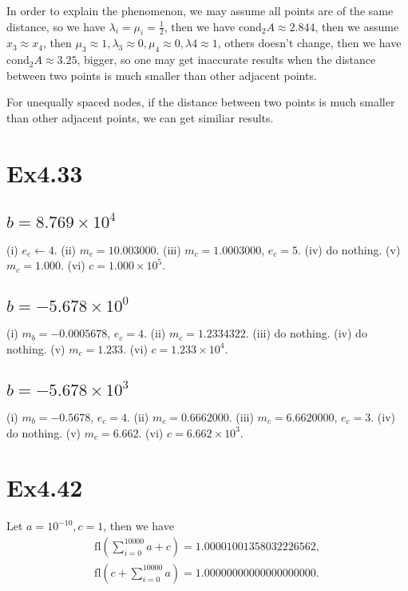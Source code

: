 \documentclass[a4paper]{article}
\begin{document}
In order to explain the phenomenon, we may assume all points are of the same distance, so we have $\lambda_i = \mu_i = \frac{1}{2}$, then we have $\mathrm{cond}_2 A \approx 2.844$, then we assume $x_3 \approx x_4$, then $\mu_3 \approx 1, \lambda_3 \approx 0, \mu_4 \approx 0, \lambda 4 \approx 1$, others doesn't change, then we have $\mathrm{cond}_2 A \approx 3.25$, bigger, so one may get inaccurate results when the distance between two points is much smaller than other adjacent points.

For unequally spaced nodes, if the distance between two points is much smaller than other adjacent points, we can get similiar results. 


\section*{Ex4.33}

\subsection*{$b=8.769 \times 10^4$}

(i) $e_c \leftarrow 4$. 
(ii) $m_c = 10.003000$. 
(iii) $m_c = 1.0003000$, $e_c = 5$. 
(iv) do nothing. 
(v) $m_c = 1.000$. 
(vi) $c = 1.000 \times 10^5$. 

\subsection*{$b = -5.678 \times 10^0$}

(i) $m_b = -0.0005678$, $e_c = 4$. 
(ii) $m_c = 1.2334322$. 
(iii) do nothing. 
(iv) do nothing. 
(v) $m_c = 1.233$. 
(vi) $c = 1.233 \times 10^4$. 

\subsection*{$b = -5.678 \times 10^3$}

(i) $m_b = -0.5678$, $e_c = 4$. 
(ii) $m_c = 0.6662000$. 
(iii) $m_c = 6.6620000$, $e_c = 3$. 
(iv) do nothing. 
(v) $m_c = 6.662$. 
(vi) $c = 6.662 \times 10^3$.


\section*{Ex4.42}
Let $a=10^{-10}, c=1$, then we have
\begin{equation}
    \begin{aligned}
        \mathrm{fl} (\sum_{i=0}^{10000} a + c) = 1.00001001358032226562, \\
        \mathrm{fl} (c + \sum_{i=0}^{10000} a) = 1.00000000000000000000.
    \end{aligned}
\end{equation}
\end{document}

